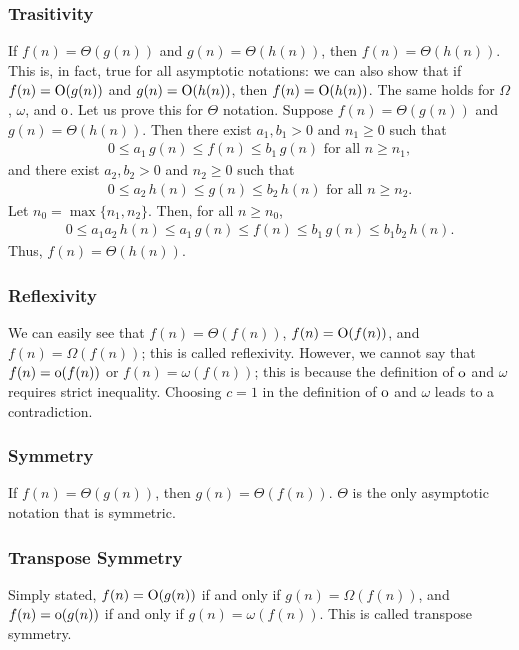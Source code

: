 \subsubsection{Trasitivity}
If $f(n) = \Theta(g(n))$ and $g(n) = \Theta(h(n))$, then $f(n) = \Theta(h(n))$. This is, in fact, true for all asymptotic notations: we can also show that if $f(n) = \operatorname{O}(g(n))$ and $g(n) = \operatorname{O}(h(n))$, then $f(n) = \operatorname{O}(h(n))$. The same holds for $\Omega$, $\omega$, and $\operatorname{o}$. Let us prove this for $\Theta$ notation. Suppose $f(n) = \Theta(g(n))$ and $g(n) = \Theta(h(n))$. Then there exist $a_{1},b_{1} > 0$ and $n_{1} \geq 0$ such that
\begin{align}
    0 \leq a_{1} \, g(n) \leq f(n) \leq b_{1} \, g(n) \text{ for all } n \geq n_{1},
\end{align}
and there exist $a_{2},b_{2} > 0$ and $n_{2} \geq 0$ such that
\begin{align}
    0 \leq a_{2} \, h(n) \leq g(n) \leq b_{2} \, h(n) \text{ for all } n \geq n_{2}.
\end{align}
Let $n_{0} = \max\{n_{1}, n_{2}\}$. Then, for all $n \geq n_{0}$,
\begin{align}
    0 \leq a_{1} a_{2} \, h(n) \leq a_{1} \, g(n) \leq f(n) \leq b_{1} \, g(n) \leq b_{1} b_{2} \, h(n).
\end{align}
Thus, $f(n) = \Theta(h(n))$.

\subsubsection{Reflexivity}
We can easily see that $f(n) = \Theta(f(n))$, $f(n) = \operatorname{O}(f(n))$, and $f(n) = \Omega(f(n))$; this is called reflexivity. However, we cannot say that $f(n) = \operatorname{o}(f(n))$ or $f(n) = \omega(f(n))$; this is because the definition of $\operatorname{o}$ and $\omega$ requires strict inequality. Choosing $c=1$ in the definition of $\operatorname{o}$ and $\omega$ leads to a contradiction.

\subsubsection{Symmetry}
If $f(n) = \Theta(g(n))$, then $g(n) = \Theta(f(n))$. $\Theta$ is the only asymptotic notation that is symmetric.

\subsubsection{Transpose Symmetry}
Simply stated, $f(n) = \operatorname{O}(g(n))$ if and only if $g(n) = \Omega(f(n))$, and $f(n) = \operatorname{o}(g(n))$ if and only if $g(n) = \omega(f(n))$. This is called transpose symmetry.

